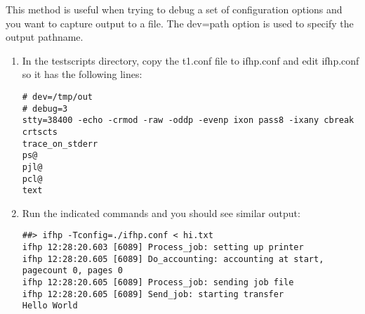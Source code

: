 \documentclass[a4paper]{article}
\begin{document}
This method is useful when trying to debug a set of configuration
options and you want to capture output to a file.
The
{\ttfamily dev=path}
option is used to specify the output pathname.
\begin{enumerate}
\item In the
{\ttfamily testscripts}
directory,
copy the
{\ttfamily t1.conf}
file to
{\ttfamily ifhp.conf}
and edit 
{\ttfamily ifhp.conf}
so it has the following lines:
\begin{tscreen}
\begin{verbatim}
# dev=/tmp/out
# debug=3
stty=38400 -echo -crmod -raw -oddp -evenp ixon pass8 -ixany cbreak crtscts
trace_on_stderr
ps@ 
pjl@
pcl@
text
\end{verbatim}
\end{tscreen}
\item Run the indicated commands and you should see similar output:
\begin{tscreen}
\begin{verbatim}
##> ifhp -Tconfig=./ifhp.conf < hi.txt
ifhp 12:28:20.603 [6089] Process_job: setting up printer
ifhp 12:28:20.605 [6089] Do_accounting: accounting at start, pagecount 0, pages 0
ifhp 12:28:20.605 [6089] Process_job: sending job file
ifhp 12:28:20.605 [6089] Send_job: starting transfer
Hello World


\end{verbatim}
\end{tscreen}
\end{enumerate}
\end{document}
